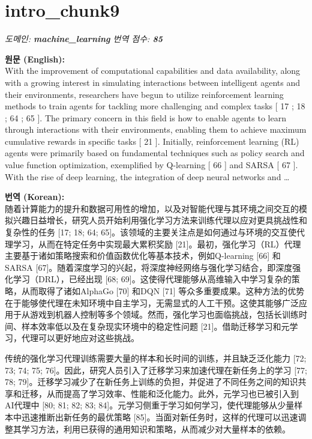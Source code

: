 \documentclass[12pt,a4paper]{article}
\begin{document}
\section{intro\_chunk9}
\noindent\textit{\small 도메인: \textbf{machine\_learning} \quad 번역 점수: \textbf{\color{green!60!black}85}}
\vspace{0.5em}

\begin{mdframed}[style=orig]
\noindent\textbf{\small 원문 (English):}\\[2pt]
\small With the improvement of computational capabilities and data availability, along with a growing interest in simulating interactions between intelligent agents and their environments, researchers have begun to utilize reinforcement learning methods to train agents for tackling more challenging and complex tasks [ 17 ; 18 ; 64 ; 65 ]. The primary concern in this field is how to enable agents to learn through interactions with their environments, enabling them to achieve maximum cumulative rewards in specific tasks [ 21 ]. Initially, reinforcement learning (RL) agents were primarily based on fundamental techniques such as policy search and value function optimization, exemplified by Q-learning [ 66 ] and SARSA [ 67 ]. With the rise of deep learning, the integration of deep neural networks and  \ldots
\end{mdframed}
\vspace{0.4em}

\begin{mdframed}[style=ko]
\noindent\textbf{\small 번역 (Korean):}\\[2pt]
随着计算能力的提升和数据可用性的增加，以及对智能代理与其环境之间交互的模拟兴趣日益增长，研究人员开始利用强化学习方法来训练代理以应对更具挑战性和复杂性的任务 [17; 18; 64; 65]。该领域的主要关注点是如何通过与环境的交互使代理学习，从而在特定任务中实现最大累积奖励 [21]。最初，强化学习（RL）代理主要基于诸如策略搜索和价值函数优化等基本技术，例如Q-learning [66] 和 SARSA [67]。随着深度学习的兴起，将深度神经网络与强化学习结合，即深度强化学习（DRL），已经出现 [68; 69]。这使得代理能够从高维输入中学习复杂的策略，从而取得了诸如AlphaGo [70] 和DQN [71] 等众多重要成果。这种方法的优势在于能够使代理在未知环境中自主学习，无需显式的人工干预。这使其能够广泛应用于从游戏到机器人控制等多个领域。然而，强化学习也面临挑战，包括长训练时间、样本效率低以及在复杂现实环境中的稳定性问题 [21]。借助迁移学习和元学习，代理可以更好地应对这些挑战。

传统的强化学习代理训练需要大量的样本和长时间的训练，并且缺乏泛化能力 [72; 73; 74; 75; 76]。因此，研究人员引入了迁移学习来加速代理在新任务上的学习 [77; 78; 79]。迁移学习减少了在新任务上训练的负担，并促进了不同任务之间的知识共享和迁移，从而提高了学习效率、性能和泛化能力。此外，元学习也已被引入到AI代理中 [80; 81; 82; 83; 84]。元学习侧重于学习如何学习，使代理能够从少量样本中迅速推断出新任务的最优策略 [85]。当面对新任务时，这样的代理可以迅速调整其学习方法，利用已获得的通用知识和策略，从而减少对大量样本的依赖。
\end{mdframed}
\vspace{1em}
\end{document}
